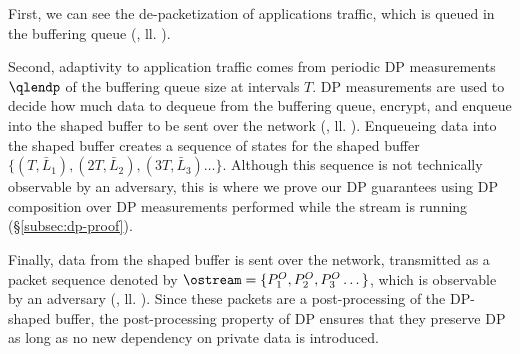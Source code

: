 First, we can see the de-packetization of applications traffic, which is queued
in the buffering queue (, ll. ).

Second, adaptivity to application traffic comes from periodic DP measurements
$\qlendp$ of the buffering queue size at intervals $T$.
DP measurements are used to decide how much data to dequeue from the buffering
queue, encrypt, and enqueue into the shaped buffer to be sent over the network
(, ll.  ).
Enqueueing data into the shaped buffer creates a sequence of states for the
shaped buffer $\{(T, \bar{L}_1), (2T, \bar{L}_2), (3T, \bar{L}_3) \dots \}$.
Although this sequence is not technically observable by an adversary, this is
where we prove our DP guarantees using DP composition over DP measurements
performed while the stream is running (\S\ref{subsec:dp-proof}).

Finally, data from the shaped buffer is sent over the network, transmitted as a
packet sequence denoted by $\ostream = \{{P^O_1}, {P^O_2}, {P^O_3} \dots \}$,
which is observable by an adversary (, ll.  ).
Since these packets are a post-processing of the DP-shaped buffer, the
post-processing property of DP ensures that they preserve DP as long as no new
dependency on private data is introduced.


